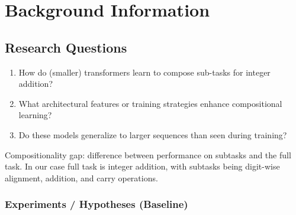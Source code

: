 \chapter{Background Information}\label{background}

\section*{Research Questions}

\begin{enumerate}
    \item How do (smaller) transformers learn to compose sub-tasks for integer addition?
    \item What architectural features or training strategies enhance compositional learning?
    \item Do these models generalize to larger sequences than seen during training?
\end{enumerate}

Compositionality gap: difference between performance on subtasks and the full task. In our case full task is integer addition, with subtasks being digit-wise alignment, addition, and carry operations.

\subsection*{Experiments / Hypotheses (Baseline)}

